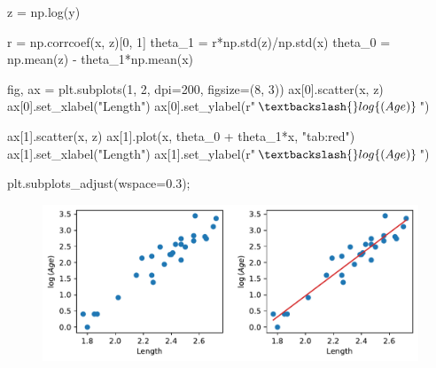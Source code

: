 \documentclass[
  letterpaper,
  DIV=11,
  numbers=noendperiod]{scrreprt}
\newenvironment{Shaded}{\begin{snugshade}}{\end{snugshade}}
\newcommand{\DecValTok}[1]{\textcolor[rgb]{0.68,0.00,0.00}{#1}}
\newcommand{\FloatTok}[1]{\textcolor[rgb]{0.68,0.00,0.00}{#1}}
\newcommand{\NormalTok}[1]{\textcolor[rgb]{0.00,0.23,0.31}{#1}}
\newcommand{\OperatorTok}[1]{\textcolor[rgb]{0.37,0.37,0.37}{#1}}
\newcommand{\StringTok}[1]{\textcolor[rgb]{0.13,0.47,0.30}{#1}}
\newcommand{\VerbatimStringTok}[1]{\textcolor[rgb]{0.13,0.47,0.30}{#1}}
\begin{document}
\begin{Shaded}
\begin{Highlighting}[]
\NormalTok{z }\OperatorTok{=}\NormalTok{ np.log(y)}

\NormalTok{r }\OperatorTok{=}\NormalTok{ np.corrcoef(x, z)[}\DecValTok{0}\NormalTok{, }\DecValTok{1}\NormalTok{]}
\NormalTok{theta\_1 }\OperatorTok{=}\NormalTok{ r}\OperatorTok{*}\NormalTok{np.std(z)}\OperatorTok{/}\NormalTok{np.std(x)}
\NormalTok{theta\_0 }\OperatorTok{=}\NormalTok{ np.mean(z) }\OperatorTok{{-}}\NormalTok{ theta\_1}\OperatorTok{*}\NormalTok{np.mean(x)}

\NormalTok{fig, ax }\OperatorTok{=}\NormalTok{ plt.subplots(}\DecValTok{1}\NormalTok{, }\DecValTok{2}\NormalTok{, dpi}\OperatorTok{=}\DecValTok{200}\NormalTok{, figsize}\OperatorTok{=}\NormalTok{(}\DecValTok{8}\NormalTok{, }\DecValTok{3}\NormalTok{))}
\NormalTok{ax[}\DecValTok{0}\NormalTok{].scatter(x, z)}
\NormalTok{ax[}\DecValTok{0}\NormalTok{].set\_xlabel(}\StringTok{"Length"}\NormalTok{)}
\NormalTok{ax[}\DecValTok{0}\NormalTok{].set\_ylabel(}\VerbatimStringTok{r"$\textbackslash{}log\{(Age)\}$"}\NormalTok{)}

\NormalTok{ax[}\DecValTok{1}\NormalTok{].scatter(x, z)}
\NormalTok{ax[}\DecValTok{1}\NormalTok{].plot(x, theta\_0 }\OperatorTok{+}\NormalTok{ theta\_1}\OperatorTok{*}\NormalTok{x, }\StringTok{"tab:red"}\NormalTok{)}
\NormalTok{ax[}\DecValTok{1}\NormalTok{].set\_xlabel(}\StringTok{"Length"}\NormalTok{)}
\NormalTok{ax[}\DecValTok{1}\NormalTok{].set\_ylabel(}\VerbatimStringTok{r"$\textbackslash{}log\{(Age)\}$"}\NormalTok{)}

\NormalTok{plt.subplots\_adjust(wspace}\OperatorTok{=}\FloatTok{0.3}\NormalTok{)}\OperatorTok{;}
\end{Highlighting}
\end{Shaded}

\begin{figure}[H]

{\centering \includegraphics{constant_model_loss_transformations/loss_transformations_files/figure-pdf/cell-7-output-1.pdf}

}

\end{figure}
\end{document}
